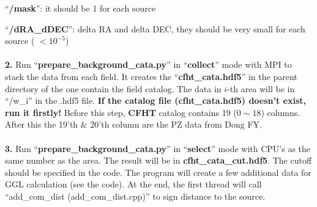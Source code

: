 \documentclass[12pt, a4paper]{article}
\begin{document}
\noindent``\textbf{/mask}'': it should be 1 for each source

\noindent``\textbf{/dRA\_dDEC}'': delta RA and delta DEC, they should be very small for each source ( $< 10^{-5}$)
\\ \hspace*{\fill} \\

\noindent\textbf{2.} Run ``\textbf{prepare\_background\_cata.py}'' in ``\textbf{collect}'' mode with MPI to stack the data from each field. It creates the ``\textbf{cfht\_cata.hdf5}'' in the parent directory of the one contain the field catalog. The data in $i$-th area will be in ``/w\_i'' in the .hdf5 file. \textbf{If the catalog file (cfht\_cata.hdf5) doesn't exist, run it firstly!} Before this step, \textbf{CFHT} catalog contains 19 ($0\sim 18$) columns. After this the 19'th \& 20'th column are the PZ data from Dong FY.
\\ \hspace*{\fill} \\

\noindent\textbf{3.} Run ``\textbf{prepare\_background\_cata.py}'' in ``\textbf{select}'' mode with CPU's as the same number as the area. The result will be in \textbf{cfht\_cata\_cut.hdf5}. The cutoff should be specified in the code. The program will create a few additional data for GGL calculation (see the code). At the end, the first thread will call ``add\_com\_dist (add\_com\_dist.cpp)'' to sign distance to the source.
\end{document}
